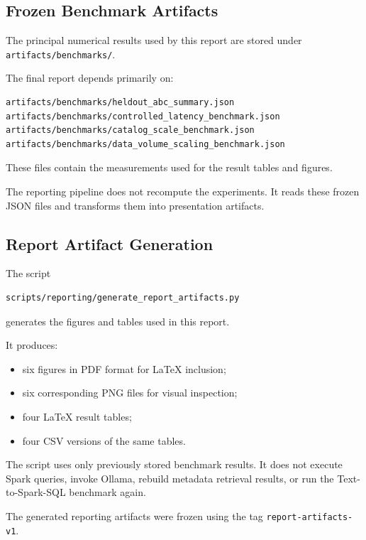 \subsection{Frozen Benchmark Artifacts}

The principal numerical results used by this report are stored under
\texttt{artifacts/benchmarks/}.

The final report depends primarily on:

\begin{verbatim}
artifacts/benchmarks/heldout_abc_summary.json
artifacts/benchmarks/controlled_latency_benchmark.json
artifacts/benchmarks/catalog_scale_benchmark.json
artifacts/benchmarks/data_volume_scaling_benchmark.json
\end{verbatim}

These files contain the measurements used for the result tables and figures.

The reporting pipeline does not recompute the experiments. It reads these
frozen JSON files and transforms them into presentation artifacts.


\subsection{Report Artifact Generation}

The script

\begin{verbatim}
scripts/reporting/generate_report_artifacts.py
\end{verbatim}

generates the figures and tables used in this report.

It produces:

\begin{itemize}

    \item six figures in PDF format for LaTeX inclusion;
    \item six corresponding PNG files for visual inspection;
    \item four LaTeX result tables;
    \item four CSV versions of the same tables.

\end{itemize}

The script uses only previously stored benchmark results. It does not execute
Spark queries, invoke Ollama, rebuild metadata retrieval results, or run the
Text-to-Spark-SQL benchmark again.

The generated reporting artifacts were frozen using the tag
\texttt{report-artifacts-v1}.



